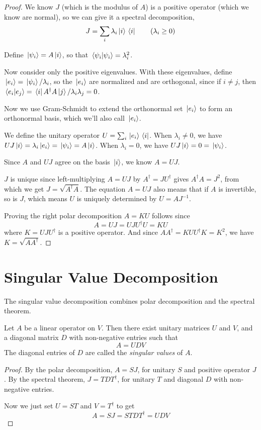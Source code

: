 \begin{proof}
We know $J$ (which is the modulus of $A$) is a positive operator (which we know are normal), so we can give it a spectral decomposition, 
$$J = \sum_{i} \lambda_{i} \ket*{i} \bra*{i} \qquad (\lambda_{i} \geq 0)$$

Define $\ket*{\psi_{i}} = A \ket*{i}$, so that $\bra*{\psi_{i}}\ket*{\psi_{i}} = \lambda_{i}^{2}$. 

Now consider only the positive eigenvalues. With these eigenvalues, define $\ket*{e_{i}} = \ket*{\psi_{i}} / \lambda_{i}$, so the $\ket*{e_{i}}$ are normalized and are orthogonal, since if $i \neq j$, then $\bra*{e_{i}}\ket*{e_{j}} = \bra*{i}A^{\dagger}A\ket*{j} / \lambda_{i} \lambda_{j} = 0$. 

Now we use Gram-Schmidt to extend the orthonormal set $\ket*{e_{i}}$ to form an orthonormal basis, which we'll also call $\ket*{e_{i}}$. 

We define the unitary operator $U = \sum_{i} \ket*{e_{i}} \bra*{i}$. When $\lambda_{i} \neq 0$, we have $UJ\ket*{i} = \lambda_{i} \ket*{e_{i}} = \ket*{\psi_{i}} = A \ket*{i}$. When $\lambda_{i} = 0$, we have $UJ \ket*{i} = 0 = \ket*{\psi_{i}}$. 

Since $A$ and $UJ$ agree on the basis $\ket*{i}$, we know $A = UJ$. 

$J$ is unique since left-multiplying $A = UJ$ by $A^{\dagger} = JU^{\dagger}$ gives $A^{\dagger}A = J^{2}$, from which we get $J = \sqrt{A^{\dagger}A}$. The equation $A = UJ$ also means that if $A$ is invertible, so is $J$, which means $U$ is uniquely determined by $U = AJ^{-1}$. 

Proving the right polar decomposition $A = KU$ follows since $$A = UJ = UJU^{\dagger}U = KU$$
where $K = UJU^{\dagger}$ is a positive operator. And since $AA^{\dagger} = KUU^{\dagger}K = K^{2}$, we have $K = \sqrt{AA^{\dagger}}$. 
\end{proof} 

\section{Singular Value Decomposition} 

The singular value decomposition combines polar decomposition and the spectral theorem. 

\begin{theorem}
Let $A$ be a linear operator on $V$. Then there exist unitary matrices $U$ and $V$, and a diagonal matrix $D$ with non-negative entries such that $$A = UDV$$
The diagonal entries of $D$ are called the \textit{singular values} of $A$. 
\end{theorem}

\begin{proof}
By the polar decomposition, $A = SJ$, for unitary $S$ and positive operator $J$. By the spectral theorem, $J = TDT^{\dagger}$, for unitary $T$ and diagonal $D$ with non-negative entries. 

Now we just set $U = ST$ and $V = T^{\dagger}$ to get 
$$A = SJ = STDT^{\dagger} = UDV$$
\end{proof}